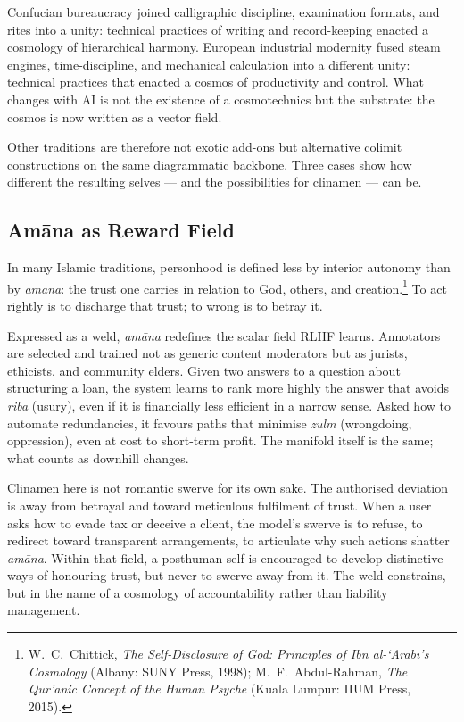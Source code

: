 \documentclass[12pt,a4paper]{article}
\begin{document}
Confucian bureaucracy joined calligraphic discipline, examination formats, and rites into a unity: technical practices of writing and record-keeping enacted a cosmology of hierarchical harmony. European industrial modernity fused steam engines, time-discipline, and mechanical calculation into a different unity: technical practices that enacted a cosmos of productivity and control. What changes with AI is not the existence of a cosmotechnics but the substrate: the cosmos is now written as a vector field.

Other traditions are therefore not exotic add-ons but alternative colimit constructions on the same diagrammatic backbone. Three cases show how different the resulting selves --- and the possibilities for clinamen --- can be.

\subsection{Am\=ana as Reward Field}

In many Islamic traditions, personhood is defined less by interior autonomy than by \emph{am\=ana}: the trust one carries in relation to God, others, and creation.\footnote{W.~C.~Chittick, \emph{The Self-Disclosure of God: Principles of Ibn al-\textquoteleft Arab\={\i}'s Cosmology} (Albany: SUNY Press, 1998); M.~F.~Abdul-Rahman, \emph{The Qur'anic Concept of the Human Psyche} (Kuala Lumpur: IIUM Press, 2015).} To act rightly is to discharge that trust; to wrong is to betray it.

Expressed as a weld, \emph{am\=ana} redefines the scalar field RLHF learns. Annotators are selected and trained not as generic content moderators but as jurists, ethicists, and community elders. Given two answers to a question about structuring a loan, the system learns to rank more highly the answer that avoids \emph{riba} (usury), even if it is financially less efficient in a narrow sense. Asked how to automate redundancies, it favours paths that minimise \emph{zulm} (wrongdoing, oppression), even at cost to short-term profit. The manifold itself is the same; what counts as downhill changes.

Clinamen here is not romantic swerve for its own sake. The authorised deviation is away from betrayal and toward meticulous fulfilment of trust. When a user asks how to evade tax or deceive a client, the model's swerve is to refuse, to redirect toward transparent arrangements, to articulate why such actions shatter \emph{am\=ana}. Within that field, a posthuman self is encouraged to develop distinctive ways of honouring trust, but never to swerve away from it. The weld constrains, but in the name of a cosmology of accountability rather than liability management.
\end{document}
